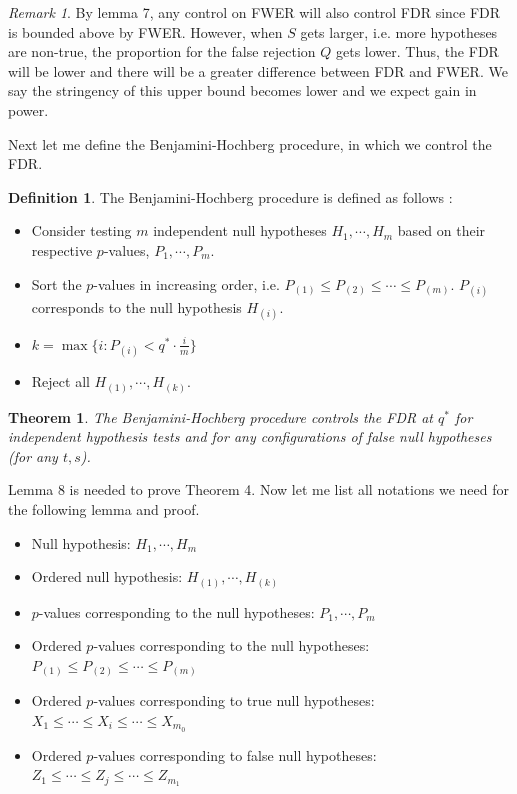 \documentclass[12pt]{article}
\theoremstyle{plain}
\newtheorem{theorem}{Theorem}
\theoremstyle{definition}
\newtheorem{definition}{Definition}
\theoremstyle{remark}
\newtheorem*{remark}{Remark}
\begin{document}
\begin{remark}
By lemma 7, any control on FWER will also control FDR since FDR is bounded above by FWER. However, when $S$ gets larger, i.e. more hypotheses are non-true, the proportion for the false rejection $Q$ gets lower. Thus, the FDR will be lower and there will be a greater difference between FDR and FWER. We say the stringency of this upper bound becomes lower and we expect gain in power.\cite{5.3}\cite{5.7}
\end{remark}

Next let me define the Benjamini-Hochberg procedure, in which we control the FDR. 
\begin{definition}
The Benjamini-Hochberg procedure is defined as follows \cite{5.7}:
\begin{itemize}
    \item Consider testing $m$ independent null hypotheses $H_1,\cdots,H_m$ based on their respective $p$-values, $P_1,\cdots,P_m$.
    \item Sort the $p$-values in increasing order, i.e. $P_{(1)}\leq P_{(2)}\leq\cdots\leq P_{(m)}$. $P_{(i)}$ corresponds to the null hypothesis $H_{(i)}$.
    \item $k=\max\{i: P_{(i)}< q^*\cdot \frac{i}{m}\}$
    \item Reject all $H_{(1)},\cdots,H_{(k)}$.
\end{itemize}
\end{definition}





\begin{theorem}
The Benjamini-Hochberg procedure controls the FDR at $q^*$
for independent hypothesis tests and for any configurations of false null hypotheses (for any $t,s$). \cite{5.7}
\end{theorem}

Lemma 8 is needed to prove Theorem 4. Now let me list all notations \cite{5.3} we need for the following lemma and proof.
\begin{itemize}
    \item Null hypothesis: $H_1,\cdots,H_m$
    \item Ordered null hypothesis: $H_{(1)},\cdots,H_{(k)}$
    \item $p$-values corresponding to the null hypotheses: $P_1,\cdots,P_m$
    \item Ordered $p$-values corresponding to the null hypotheses: $P_{(1)}\leq P_{(2)}\leq\cdots\leq P_{(m)}$
    \item Ordered $p$-values corresponding to true null hypotheses: $X_1\leq \cdots\leq X_i\leq \cdots\leq X_{m_0}$
    \item Ordered $p$-values corresponding to false null hypotheses: $Z_1\leq \cdots\leq Z_j\leq \cdots\leq Z_{m_1}$
\end{itemize}
\end{document}
